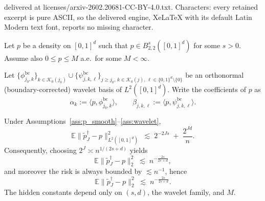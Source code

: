 \documentclass[10pt,a4paper]{amsart}
\def\EE{\mathbb{E}}
\def\calK{\mathcal{K}}
\begin{document}
delivered at licenses/arxiv-2602.20681-CC-BY-4.0.txt. Characters: every retained excerpt is pure ASCII, so the delivered engine, XeLaTeX with its default Latin Modern text font, reports no missing character.
\begin{assumption}\label{ass:p_smooth}
Let $p$ be a density on $[0,1]^d$ such that $p \in B^{s}_{2,2}([0,1]^d)$ for some $s>0$.
Assume also $0 \le p \le M$ a.e.\ for some $M<\infty$.
\end{assumption}

\begin{assumption}\label{ass:wavelet}
Let $\{\phi_{j_0,k}^{\mathrm{bc}}\}_{k\in\calK_0(j_0)} \cup \{\psi^{\mathrm{bc}}_{j,k,\ell}\}_{j\ge j_0,\,k\in\calK_0(j),\,\ell\in\{0,1\}^d\setminus\{0\}}$
be an orthonormal (boundary-corrected) wavelet basis of $L^2([0,1]^d)$.
Write the coefficients of $p$ as
\[
\alpha_{k} := \langle p, \phi_{j_0,k}^{\mathrm{bc}}\rangle,
\qquad
\beta_{j,k,\ell} := \langle p, \psi^{\mathrm{bc}}_{j,k,\ell}\rangle.
\]
\end{assumption}

\begin{theorem}\label{thm:L2_rate_trunc}
Under Assumptions~\ref{ass:p_smooth}--\ref{ass:wavelet},
\[
\EE\|\tilde p_J^{\dagger} - p\|_{L^2([0,1]^d)}^2
\;\lesssim\;
2^{-2Js} \;+\; \frac{2^{Jd}}{n}.
\]
Consequently, choosing $2^J \asymp n^{1/(2s+d)}$ yields
\[
\EE\|\tilde p_J^{\dagger} - p\|_2^2 \;\lesssim\; n^{-\frac{2s}{2s+d}},
\]
and moreover the risk is always bounded by $\lesssim n^{-1}$, hence
\[
\EE\|\tilde p_J^{\dagger} - p\|_2^2 \;\lesssim\; n^{-\frac{2s}{2s+d}}.
\]
The hidden constants depend only on $(s,d)$, the wavelet family, and $M$.
\end{theorem}
\end{document}
